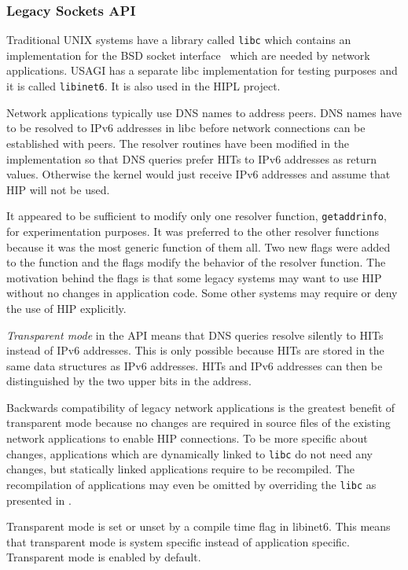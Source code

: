 \subsubsection{Legacy Sockets API}
\label{sec:legacy_api_architecture}

Traditional UNIX systems have a library called \verb|libc| which
contains an implementation for the BSD socket interface~\cite{stevens}
which are needed by network applications. USAGI has a separate libc
implementation for testing purposes and it is called
\verb|libinet6|. It is also used in the \ac{HIPL} project.

Network applications typically use \ac{DNS} names to address
peers. \ac{DNS} names have to be resolved to IPv6 addresses in libc
before network connections can be established with peers. The resolver
routines have been modified in the implementation so that \ac{DNS}
queries prefer \acp{HIT} to IPv6 addresses as return values. Otherwise
the kernel would just receive IPv6 addresses and assume that \ac{HIP}
will not be used.

It appeared to be sufficient to modify only one resolver function,
\verb|getaddrinfo|, for experimentation purposes. It was preferred to
the other resolver functions because it was the most generic function
of them all. Two new flags were added to the function and the flags
modify the behavior of the resolver function. The motivation behind
the flags is that some legacy systems may want to use \ac{HIP} without
no changes in application code. Some other systems may require or deny
the use of \ac{HIP} explicitly.

\textit{Transparent mode} in the \ac{API} means that \ac{DNS} queries
resolve silently to \acp{HIT} instead of IPv6 addresses. This is only
possible because \acp{HIT} are stored in the same data structures as
IPv6 addresses. \acp{HIT} and IPv6 addresses can then be distinguished
by the two upper bits in the address.

Backwards compatibility of legacy network applications is the greatest
benefit of transparent mode because no changes are required in source
files of the existing network applications to enable \ac{HIP}
connections. To be more specific about changes, applications which are
dynamically linked to \verb|libc| do not need any changes, but
statically linked applications require to be recompiled. The
recompilation of applications may even be omitted by overriding the
\verb|libc| as presented in \cite{libcoverride}.

Transparent mode is set or unset by a compile time flag in
libinet6. This means that transparent mode is system specific instead
of application specific. Transparent mode is enabled by default.

